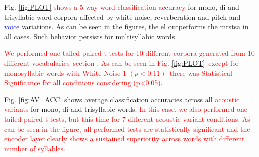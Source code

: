 \documentclass[10pt,letterpaper]{article}
\begin{document}

Fig. \ref{fig:PLOT}
\textcolor{red}{shows a 5-way word classification accuracy} for mono, di and trisyllabic word corpora affected by
white noise, reverberation and pitch \textcolor{blue}{and voice} variations.
As can be seen in the figures, the \gls{el} outperforms the \gls{mrstsa} in all cases.
Such behavior persists for multisyllabic words.

\textcolor{red}{We performed one-tailed paired t-tests for 10 different corpora generated from 10 different vocabularies--section . As can be seen in Fig. \ref{fig:PLOT}--except for monosyllabic words with White Noise 1 $(p < 0.11)$--there was Statistical Significance for all conditions considering (p<0.05)}.

Fig. \ref{fig:AV_ACC} shows average classification accuracies across all \textcolor{red}{acoustic variants} for mono, di and trisyllabic words.
\textcolor{red}{In this case, we also performed one-tailed paired t-tests, but this time for 7 different acoustic variant conditions.
As can be seen in the figure, all performed tests are statistically significant and the encoder layer clearly shows
a sustained superiority across words with different number of syllables}.
 
\end{document}
